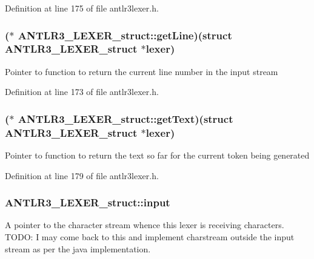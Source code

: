 Definition at line 175 of file antlr3lexer.\-h.

\hypertarget{struct_a_n_t_l_r3___l_e_x_e_r__struct_a151c4767a28ceccf7fb5bd81e30eaeec}{
\subsubsection[{get\-Line}]{($\ast$ A\-N\-T\-L\-R3\-\_\-\-L\-E\-X\-E\-R\-\_\-struct\-::get\-Line)(struct {\bf A\-N\-T\-L\-R3\-\_\-\-L\-E\-X\-E\-R\-\_\-struct} $\ast$lexer)}}\label{struct_a_n_t_l_r3___l_e_x_e_r__struct_a151c4767a28ceccf7fb5bd81e30eaeec}
Pointer to function to return the current line number in the input stream 

Definition at line 173 of file antlr3lexer.\-h.

\hypertarget{struct_a_n_t_l_r3___l_e_x_e_r__struct_aa916fc721b7c14ee4bb57b1c7fb88e60}{
\subsubsection[{get\-Text}]{($\ast$ A\-N\-T\-L\-R3\-\_\-\-L\-E\-X\-E\-R\-\_\-struct\-::get\-Text)(struct {\bf A\-N\-T\-L\-R3\-\_\-\-L\-E\-X\-E\-R\-\_\-struct} $\ast$lexer)}}\label{struct_a_n_t_l_r3___l_e_x_e_r__struct_aa916fc721b7c14ee4bb57b1c7fb88e60}
Pointer to function to return the text so far for the current token being generated 

Definition at line 179 of file antlr3lexer.\-h.

\hypertarget{struct_a_n_t_l_r3___l_e_x_e_r__struct_a63668c0391badeb589243179e93f1a0a}{
\subsubsection[{input}]{ A\-N\-T\-L\-R3\-\_\-\-L\-E\-X\-E\-R\-\_\-struct\-::input}}\label{struct_a_n_t_l_r3___l_e_x_e_r__struct_a63668c0391badeb589243179e93f1a0a}
A pointer to the character stream whence this lexer is receiving characters. T\-O\-D\-O\-: I may come back to this and implement charstream outside the input stream as per the java implementation. 

